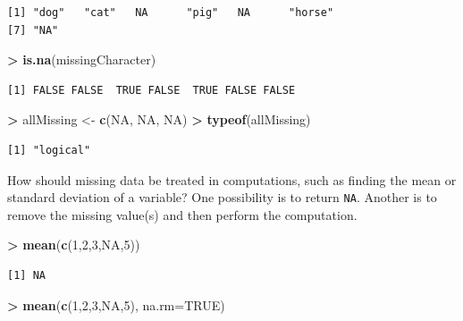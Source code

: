 \documentclass[
]{krantz}
\makeatletter
\newenvironment{Shaded}{\begin{snugshade}}{\end{snugshade}}
\newcommand{\DataTypeTok}[1]{\textcolor[rgb]{0.27,0.27,0.27}{#1}}
\newcommand{\DecValTok}[1]{\textcolor[rgb]{0.06,0.06,0.06}{#1}}
\newcommand{\KeywordTok}[1]{\textcolor[rgb]{0.27,0.27,0.27}{\textbf{#1}}}
\newcommand{\NormalTok}[1]{#1}
\newcommand{\OperatorTok}[1]{\textcolor[rgb]{0.43,0.43,0.43}{\textbf{#1}}}
\newcommand{\OtherTok}[1]{\textcolor[rgb]{0.37,0.37,0.37}{#1}}
\newcommand{\StringTok}[1]{\textcolor[rgb]{0.5,0.5,0.5}{#1}}
\newenvironment{kframe}{%
\medskip{}
\setlength{\fboxsep}{.8em}
 \def\at@end@of@kframe{}%
 \ifinner\ifhmode%
  \def\at@end@of@kframe{\end{minipage}}%
  \begin{minipage}{\columnwidth}%
 \fi\fi%
 \def\FrameCommand##1{\hskip\@totalleftmargin \hskip-\fboxsep
 \colorbox{shadecolor}{##1}\hskip-\fboxsep
     \hskip-\linewidth \hskip-\@totalleftmargin \hskip\columnwidth}%
 \MakeFramed {\advance\hsize-\width
   \@totalleftmargin\z@ \linewidth\hsize
   \@setminipage}}%
 {\par\unskip\endMakeFramed%
 \at@end@of@kframe}
\renewenvironment{Shaded}{\begin{kframe}}{\end{kframe}}
\makeatother
\begin{document}
\begin{verbatim}
[1] "dog"   "cat"   NA      "pig"   NA      "horse"
[7] "NA"   
\end{verbatim}

\begin{Shaded}
\begin{Highlighting}[]
\OperatorTok{\textgreater{}}\StringTok{ }\KeywordTok{is.na}\NormalTok{(missingCharacter)}
\end{Highlighting}
\end{Shaded}

\begin{verbatim}
[1] FALSE FALSE  TRUE FALSE  TRUE FALSE FALSE
\end{verbatim}

\begin{Shaded}
\begin{Highlighting}[]
\OperatorTok{\textgreater{}}\StringTok{ }\NormalTok{allMissing \textless{}{-}}\StringTok{ }\KeywordTok{c}\NormalTok{(}\OtherTok{NA}\NormalTok{, }\OtherTok{NA}\NormalTok{, }\OtherTok{NA}\NormalTok{)}
\OperatorTok{\textgreater{}}\StringTok{ }\KeywordTok{typeof}\NormalTok{(allMissing)}
\end{Highlighting}
\end{Shaded}

\begin{verbatim}
[1] "logical"
\end{verbatim}

How should missing data be treated in computations, such as finding the mean or standard deviation of a variable? One possibility is to return \texttt{NA}. Another is to remove the missing value(s) and then perform the computation.

\begin{Shaded}
\begin{Highlighting}[]
\OperatorTok{\textgreater{}}\StringTok{ }\KeywordTok{mean}\NormalTok{(}\KeywordTok{c}\NormalTok{(}\DecValTok{1}\NormalTok{,}\DecValTok{2}\NormalTok{,}\DecValTok{3}\NormalTok{,}\OtherTok{NA}\NormalTok{,}\DecValTok{5}\NormalTok{))}
\end{Highlighting}
\end{Shaded}

\begin{verbatim}
[1] NA
\end{verbatim}

\begin{Shaded}
\begin{Highlighting}[]
\OperatorTok{\textgreater{}}\StringTok{ }\KeywordTok{mean}\NormalTok{(}\KeywordTok{c}\NormalTok{(}\DecValTok{1}\NormalTok{,}\DecValTok{2}\NormalTok{,}\DecValTok{3}\NormalTok{,}\OtherTok{NA}\NormalTok{,}\DecValTok{5}\NormalTok{), }\DataTypeTok{na.rm=}\OtherTok{TRUE}\NormalTok{)}
\end{Highlighting}
\end{Shaded}
\end{document}
